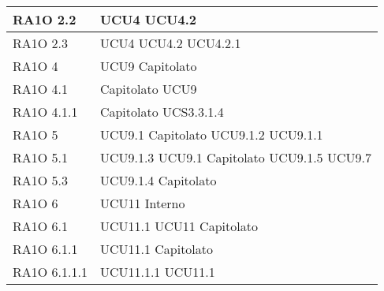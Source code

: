 \begin{center}
\begin{longtable}{ | p{5cm} | p{5cm} |}
        RA1O 2.2 &  UCU4 \newline  UCU4.2 \newline  \\ \hline      
        RA1O 2.3 &  UCU4 \newline  UCU4.2 \newline  UCU4.2.1 \newline  \\ \hline      
        RA1O 4 &  UCU9 \newline  Capitolato \newline  \\ \hline      
        RA1O 4.1  &  Capitolato \newline  UCU9 \newline  \\ \hline      
        RA1O 4.1.1  &  Capitolato \newline  UCS3.3.1.4 \newline  \\ \hline      
        RA1O 5  &  UCU9.1 \newline  Capitolato \newline  UCU9.1.2 \newline  UCU9.1.1 \newline  \\ \hline      
        RA1O 5.1 &  UCU9.1.3 \newline  UCU9.1 \newline  Capitolato \newline  UCU9.1.5 \newline  UCU9.7 \newline  \\ \hline      
        RA1O 5.3 &  UCU9.1.4 \newline  Capitolato \newline  \\ \hline      
        RA1O 6 &  UCU11 \newline  Interno \newline  \\ \hline      
        RA1O 6.1  &  UCU11.1 \newline  UCU11 \newline  Capitolato \newline  \\ \hline      
        RA1O 6.1.1  &  UCU11.1 \newline  Capitolato \newline  \\ \hline      
        RA1O 6.1.1.1  &  UCU11.1.1 \newline  UCU11.1 \newline  \\ \hline      

\end{longtable}
\end{center}

